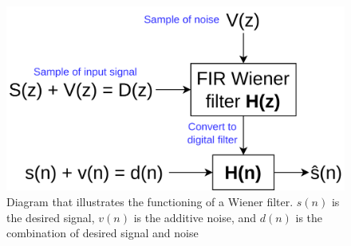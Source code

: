 \begin{figure}[h!t]
	\begin{center}
		\includegraphics[width=0.7\columnwidth]{images/WienerFilterDiagram.png}
	\end{center}
	\caption{Diagram that illustrates the functioning of a Wiener filter. $s(n)$ is the desired signal, $v(n)$ is the additive noise, and $d(n)$ is the combination of desired signal and noise \cite{wiener_filter_system_identification}}
	\label{fig:wiener_filter_diagram}
\end{figure}


